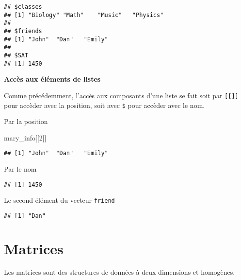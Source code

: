 \documentclass[]{book}
\newenvironment{Shaded}{\begin{snugshade}}{\end{snugshade}}
\newcommand{\DecValTok}[1]{\textcolor[rgb]{0.00,0.00,0.81}{#1}}
\newcommand{\NormalTok}[1]{#1}
\newcommand{\OperatorTok}[1]{\textcolor[rgb]{0.81,0.36,0.00}{\textbf{#1}}}
\begin{document}
\begin{verbatim}
## $classes
## [1] "Biology" "Math"    "Music"   "Physics"
## 
## $friends
## [1] "John"  "Dan"   "Emily"
## 
## $SAT
## [1] 1450
\end{verbatim}

\textbf{Accès aux éléments de listes}

Comme précédemment, l'accès aux composants d'une liste se fait soit par \texttt{{[}{[}{]}{]}} pour accèder avec la position, soit avec \texttt{\$} pour accèder avec le nom.

Par la position

\begin{Shaded}
\begin{Highlighting}[]
\NormalTok{mary_info[[}\DecValTok{2}\NormalTok{]]}
\end{Highlighting}
\end{Shaded}

\begin{verbatim}
## [1] "John"  "Dan"   "Emily"
\end{verbatim}

Par le nom

\begin{Shaded}
\end{Shaded}

\begin{verbatim}
## [1] 1450
\end{verbatim}

Le second élément du vecteur \texttt{friend}

\begin{Shaded}
\end{Shaded}

\begin{verbatim}
## [1] "Dan"
\end{verbatim}

\hypertarget{matrices}{%
\section{Matrices}\label{matrices}}

Les matrices sont des structures de données à deux dimensions et homogènes.
\end{document}
